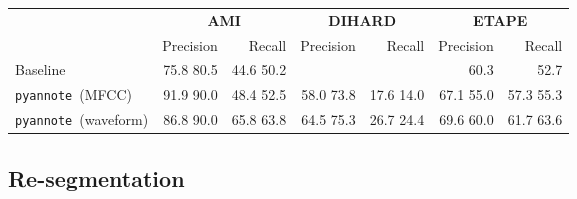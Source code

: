 \documentclass{article}
\def\pyannote{{\small\texttt{pyannote}}}
\begin{document}
\begin{table*}[htb]
    \centering
    \begin{tabular}{|l|r|r|r|r|r|r|}
        \hline
        & \multicolumn{2}{c|}{\textbf{AMI}} & \multicolumn{2}{c|}{\textbf{DIHARD}} & \multicolumn{2}{c|}{\textbf{ETAPE}}\\
        & Precision & Recall & Precision & Recall & Precision & Recall \\
        \hline
Baseline                    & 75.8 {\scriptsize{80.5}} \cite{Kunesova2019} & 44.6 {\scriptsize{50.2}} \cite{Kunesova2019} & & & 60.3 \cite{Charlet2013} &  52.7 \cite{Charlet2013} \\
                \hline
\pyannote~(MFCC) &  91.9 \scriptsize{90.0} & 48.4 \scriptsize{52.5} & 58.0 \scriptsize{73.8} & 17.6 \scriptsize{14.0} & 67.1 \scriptsize{55.0} & 57.3 \scriptsize{55.3} \\
\pyannote~(waveform) & 86.8 \scriptsize{90.0} & 65.8 \scriptsize{63.8} & 64.5 \scriptsize{75.3} & 26.7 \scriptsize{24.4} & 69.6 \scriptsize{60.0} & 61.7 \scriptsize{63.6} \\
\hline

    \end{tabular}
    \caption{Evaluation of pre-trained overlapped speech detection models, in terms of precision (\%) and recall (\%). Results on the development set are reported using small font size. We report two {\small{\texttt{pyannote.audio}}} variants: the first one is based on handcrafted features (MFCCs) and the other one is an end-to-end model processing the waveform directly.
\emph{Baseline} corresponds to the best result we could find in the literature as of October 2019.}
    \label{tab:ovl}
\end{table*}

\vspace{-0.17cm}
\subsection{Re-segmentation}
\label{ssec:reseg}
\end{document}
